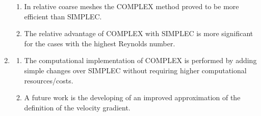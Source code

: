 \documentclass[final,3p,times,11pt,onecolumn]{myElsarticle}
\numberwithin{equation}{section}
\begin{document}
\begin{enumerate}
\begin{enumerate}
\item In relative coarse meshes the COMPLEX method proved to be more efficient than SIMPLEC.
\item The relative advantage of COMPLEX with SIMPLEC is more significant for the cases with the highest Reynolds number.
\end{enumerate}
\item 
\begin{enumerate}
\item The computational implementation of COMPLEX is performed by adding simple changes over SIMPLEC without requiring  higher computational resources/costs.
\item A future work is the developing of an improved approximation of the definition of the velocity gradient. 
\end{enumerate}
\end{enumerate}



\end{document}
